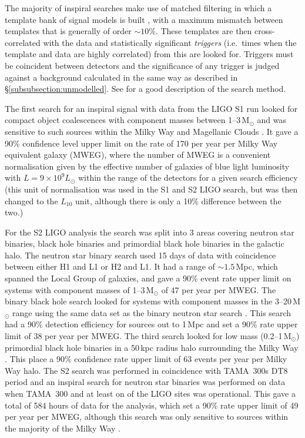 \documentclass{article}
\begin{document}
The majority of inspiral searches make use of matched filtering in which a
template bank of signal models is built \cite{Owen:1996, Owen:1999}, with a
maximum mismatch between templates that is generally of order $\sim10\%$. These
templates are then cross-correlated with the data and statistically significant
{\it triggers} (i.e.\ times when the template and data are highly correlated)
from this are looked for. Triggers must be coincident between detectors and the
significance of any trigger is judged against a background calculated in the
same way as described in \S\ref{subsubsection:unmodelled}. See
\cite{Abbott:2005b} for a good description of the search method.

The first search for an inspiral signal with data from the LIGO S1 run looked
for compact object coalescences with component masses between 1--3\,M$_{\odot}$
and was sensitive to such sources within the Milky Way and Magellanic Clouds
\cite{Abbott:2004c}. It gave a 90\% confidence level upper limit on the rate of
170 per year per Milky Way equivalent galaxy (MWEG), where the number of MWEG is
a convenient normalisation given by the effective number of galaxies of blue
light luminosity with $L = 9\times10^9L_{\odot}$ within the range of the
detectors for a given search efficiency (this unit of normalisation was used in
the S1 and S2 LIGO search, but was then changed to the $L_{10}$ unit, although
there is only a 10\% difference between the two.)

For the S2 LIGO analysis the search was split into 3 areas covering neutron star
binaries, black hole binaries and primordial black hole binaries in the galactic
halo. The neutron star binary search \cite{Abbott:2005b} used 15 days of data
with coincidence between either H1 and L1 or H2 and L1. It had a range of
$\sim1.5$\,Mpc, which spanned the Local Group of galaxies, and gave a 90\% event
rate upper limit on systems with component masses of 1--3\,M$_{\odot}$ of 47 per
year per MWEG. The binary black hole search looked for systems with component
masses in the 3--20\,M$_{\odot}$ range using the same data set as the binary
neutron star search \cite{Abbott:2006a}. This search had a 90\% detection
efficiency for sources out to 1\,Mpc and set a 90\% rate upper limit of 38 per
year per MWEG. The third search looked for low mass (0.2--1\,M$_{\odot}$)
primordial black hole binaries in a 50\,kpc radius halo surrounding the Milky
Way \cite{Abbott:2005e}. This place a 90\% confidence rate upper limit of 63
events per year per Milky Way halo. The S2 search was performed in coincidence
with TAMA~300s DT8 period and an inspiral search for neutron star binaries was
performed on data when TAMA~300 and at least on of the LIGO sites was
operational. This gave a total of 584 hours of data for the analysis, which set
a 90\% rate upper limit of 49 per year per MWEG, although this search was only
sensitive to sources within the majority of the Milky Way \cite{Abbott:2006b}.
\end{document}

